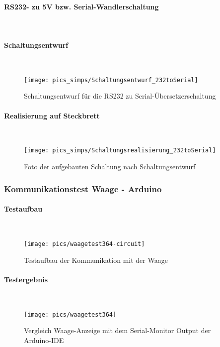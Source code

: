 \documentclass[12pt,a4paper]{article}
\begin{document}
\paragraph{RS232- zu 5V bzw. Serial-Wandlerschaltung}\mbox{}\\
\paragraph{Schaltungsentwurf}\mbox{}\\
\begin{figure}[h!]
	\centering
	\texttt{[image: pics\_simps/Schaltungsentwurf\_232toSerial]}
	\caption{Schaltungsentwurf für die RS232 zu Serial-Übersetzerschaltung}
\end{figure}
%
%
\newpage
\paragraph{Realisierung auf Steckbrett}\mbox{}\\
\begin{figure}[h!]
	\centering
	\texttt{[image: pics\_simps/Schaltungsrealisierung\_232toSerial]}
	\caption{Foto der aufgebauten Schaltung nach Schaltungsentwurf}
\end{figure}
%
%
\newpage
\subsubsection{Kommunikationstest Waage - Arduino}
%
\paragraph{Testaufbau}\mbox{}\\
\begin{figure}[h!]
	\centering
	\texttt{[image: pics/waagetest364-circuit]}
	\caption{Testaufbau der Kommunikation mit der Waage}
\end{figure}
%
\paragraph{Testergebnis}\mbox{}\\
\begin{figure}[h!]
	\centering
	\texttt{[image: pics/waagetest364]}
	\caption{Vergleich Waage-Anzeige mit dem Serial-Monitor Output der Arduino-IDE}
\end{figure}
%
%
\newpage
\end{document}
